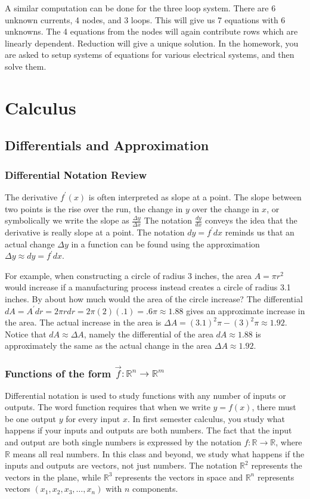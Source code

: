 \documentclass[10pt]{article}
\begin{document}
A similar computation can be done for the three loop system. There are 6 unknown currents, 4 nodes, and 3 loops.  This will give us 7 equations with 6 unknowns.  The 4 equations from the nodes will again contribute rows which are linearly dependent. Reduction will give a unique solution. In the homework, you are asked to setup systems of equations for various electrical systems, and then solve them.

\section{Calculus}

\subsection{Differentials and Approximation}

\subsubsection{Differential Notation Review}
The derivative $f^\prime(x)$ is often interpreted as slope at a point. The slope between two points is the rise over the run, the change in $y$ over the change in $x$, or symbolically we write the slope as $\frac{\Delta y}{\Delta x}$ The notation $\frac{dy}{dx}$ conveys the idea that the derivative is really slope at a point.  The notation $dy = f^\prime dx$ reminds us that an actual change $\Delta y$ in a function can be found using the approximation $\Delta y \approx dy = f^\prime dx$.

For example, when constructing a circle of radius 3 inches, the area $A=\pi r^2$ would increase if a manufacturing process instead creates a circle of radius 3.1 inches. By about how much would the area of the circle increase?  The differential $dA = A^\prime dr = 2\pi r dr = 2\pi (2)(.1)= .6\pi\approx 1.88$ gives an approximate increase in the area. The actual increase in the area is $\Delta A = (3.1)^2\pi - (3)^2 \pi\approx 1.92$. Notice that $dA \approx \Delta A$, namely the differential of the area $dA\approx 1.88$ is approximately the same as the actual change in the area $\Delta A\approx 1.92$.

\subsubsection{Functions of the form $\vec f:{\mathbb{R}}^n\to {\mathbb{R}}^m$}
Differential notation is used to study functions with any number of inputs or outputs.  The word function requires that when we write $y=f(x)$, there must be one output $y$ for every input $x$.  In first semester calculus, you study what happens if your inputs and outputs are both numbers. The fact that the input and output are both single numbers is expressed by the notation $f:{\mathbb{R}}\to{\mathbb{R}}$, where ${\mathbb{R}}$ means all real numbers. In this class and beyond, we study what happens if the inputs and outputs are vectors, not just numbers. The notation ${\mathbb{R}}^2$ represents the vectors in the plane, while ${\mathbb{R}}^3$ represents the vectors in space and ${\mathbb{R}}^n$ represents vectors $(x_1,x_2,x_3,\ldots,x_n)$ with $n$ components. 
\end{document}
